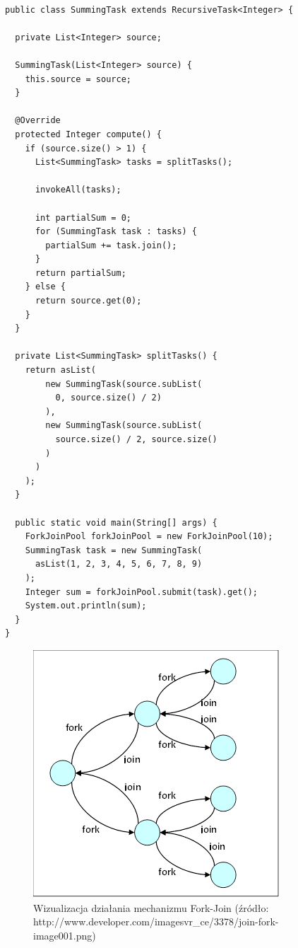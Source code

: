 \documentclass[12pt,twoside,openright]{extarticle}
\begin{document}
\begin{lstlisting}[label=fjpexample, caption=Przykładowe wykorzystanie FJP]

public class SummingTask extends RecursiveTask<Integer> {
  
  private List<Integer> source;
  
  SummingTask(List<Integer> source) {
    this.source = source;
  }
  
  @Override
  protected Integer compute() {
    if (source.size() > 1) {
      List<SummingTask> tasks = splitTasks();
      
      invokeAll(tasks);
      
      int partialSum = 0;
      for (SummingTask task : tasks) {
        partialSum += task.join();
      }
      return partialSum;
    } else {
      return source.get(0);
    }
  }
  
  private List<SummingTask> splitTasks() {
    return asList(
        new SummingTask(source.subList(
          0, source.size() / 2)
        ),
        new SummingTask(source.subList(
          source.size() / 2, source.size()
        )
      )
    );
  }
  
  public static void main(String[] args) {
    ForkJoinPool forkJoinPool = new ForkJoinPool(10);
    SummingTask task = new SummingTask(
      asList(1, 2, 3, 4, 5, 6, 7, 8, 9)
    );
    Integer sum = forkJoinPool.submit(task).get();
    System.out.println(sum);
  }
}

\end{lstlisting}

\begin{figure}[h]
\centering
\includegraphics{forkjoin.png}
\caption{Wizualizacja działania mechanizmu Fork-Join (źródło: http://www.developer.com/imagesvr\_ce/3378/join-fork-image001.png)}
\label{fig:forkjoin}
\end{figure}
\end{document}
